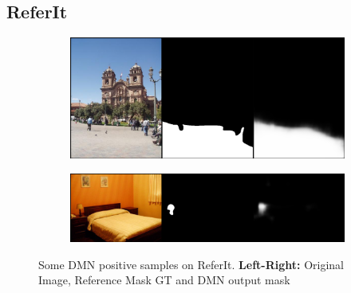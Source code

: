\subsection*{ReferIt}
\begin{figure}[!htbp]
	\centering
    
    \begin{subfigure}[b]{\columnwidth}
            \centering
            \includegraphics[width=\textwidth]{./figures/referit_samples/2.png}
    \end{subfigure}
    \begin{subfigure}[b]{\columnwidth}
            \centering
            \includegraphics[width=\textwidth]{./figures/referit_samples/6.png}
    \end{subfigure}
    
    \caption{Some DMN positive samples on ReferIt. \textbf{Left-Right:} Original Image, Reference Mask GT and DMN output mask}
    \label{Fig:Referit_Pos}
\end{figure}
